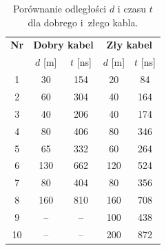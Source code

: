 \documentclass[12pt]{article}
\begin{document}
\begin{table}[H]
  \centering
  \begin{tabular}{c|cc|cc}
    \toprule
    \textbf{Nr} & \multicolumn{2}{c|}{\textbf{Dobry kabel}} & \multicolumn{2}{c}{\textbf{Zły kabel}} \\
                & $d$ [m] & $t$ [ns] & $d$ [m] & $t$ [ns] \\
    \midrule
    1 & 30  & 154 & 20  &  84 \\
    2 & 60  & 304 & 40  & 164 \\
    3 & 40  & 206 & 40  & 174 \\
    4 & 80  & 406 & 80  & 346 \\
    5 & 65  & 332 & 60  & 264 \\
    6 & 130 & 662 & 120 & 524 \\
    7 & 80  & 404 & 80  & 356 \\
    8 & 160 & 810 & 160 & 708 \\
    9 & --  & --  & 100 & 438 \\
    10& --  & --  & 200 & 872 \\
    \bottomrule
  \end{tabular}
  \caption{Porównanie odległości $d$ i czasu $t$ dla dobrego i~złego kabla.}
  \label{tab:good_vs_bad_cable}
\end{table}
\end{document}
